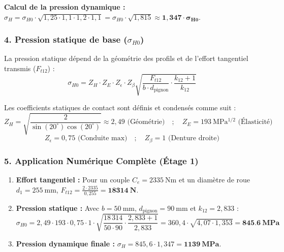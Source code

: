 \documentclass[11pt,a4paper]{article}
\begin{document}
\textbf{Calcul de la pression dynamique :} $\sigma_H = \sigma_{H0} \cdot \sqrt{1{,}25 \cdot 1{,}1 \cdot 1{,}2 \cdot 1{,}1} = \sigma_{H0} \cdot \sqrt{1{,}815} \approx \mathbf{1{,}347 \cdot \sigma_{H0}}$.

\subsubsection*{4. Pression statique de base ($\sigma_{H0}$)}

La pression statique dépend de la géométrie des profils et de l'effort tangentiel transmis ($F_{t12}$) :
\[ \sigma_{H0} = Z_H \cdot Z_E \cdot Z_\epsilon \cdot Z_\beta \sqrt{ \frac{F_{t12}}{b \cdot d_{\text{pignon}}} \cdot \frac{k_{12} + 1}{k_{12}} } \]

Les coefficients statiques de contact sont définis et condensés comme suit :
\[ Z_H = \sqrt{\frac{2}{\sin(20^\circ)\cos(20^\circ)}} \approx 2{,}49 \text{ (Géométrie)} \quad ; \quad Z_E = \qty{193}{\mega\pascal^{1/2}} \text{ (Élasticité)} \]
\[ Z_\epsilon = 0{,}75 \text{ (Conduite max)} \quad ; \quad Z_\beta = 1 \text{ (Denture droite)} \]

\subsubsection*{5. Application Numérique Complète (Étage 1)}

\begin{enumerate}
    \item \textbf{Effort tangentiel :} Pour un couple $C_e = \qty{2335}{\newton\meter}$ et un diamètre de roue $d_1 = \qty{255}{\milli\meter}$, $F_{t12} = \frac{2 \cdot 2335}{0{,}255} = \mathbf{\qty{18314}{\newton}}$.
    \item \textbf{Pression statique :} Avec $b = \qty{50}{\milli\meter}$, $d_{\text{pignon}} = \qty{90}{\milli\meter}$ et $k_{12} = 2{,}833$ :
    \[ \sigma_{H0} = 2{,}49 \cdot 193 \cdot 0{,}75 \cdot 1 \cdot \sqrt{ \frac{18\,314}{50 \cdot 90} \cdot \frac{2{,}833 + 1}{2{,}833} } = 360{,}4 \cdot \sqrt{4{,}07 \cdot 1{,}353} = \mathbf{\qty{845,6}{\mega\pascal}} \]
    \item \textbf{Pression dynamique finale :} $\sigma_H = 845{,}6 \cdot 1{,}347 = \mathbf{\qty{1139}{\mega\pascal}}$.
\end{enumerate}
\end{document}
